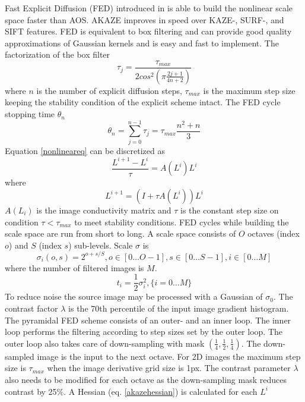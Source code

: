 \documentclass[english,12pt,a4paper,pdftex,elec,utf8, table]{aaltothesis}
\begin{document}
Fast Explicit Diffusion (FED) introduced in \cite{Grewenig2010} is able to build the nonlinear scale space faster than AOS. AKAZE improves in speed over KAZE-, SURF-, and SIFT features. FED is equivalent to box filtering and can provide good quality approximations of Gaussian kernels and is easy and fast to implement. The factorization of the box filter
\begin{equation}
  \label{boxfilterfactor}
\tau_j = \frac{\tau_{max}}{2cos^2\left( \pi \frac{2j+1}{4n+2}\right)}
\end{equation}
where $n$ is the number of explicit diffusion steps, $\tau_{max}$ is the maximum step size keeping the stability condition of the explicit scheme intact. The FED cycle stopping time $\theta_n$
\begin{equation}
\theta_n = \sum_{j=0}^{n-1}\tau_j=\tau_{max}\frac{n^2+n}{3}
\end{equation}
Equation \ref{nonlineareq} can be discretized as
\begin{equation}
  \label{discretenonlineareq}
\frac{L^{i+1}-L^i}{\tau}=A(L^i)L^i
\end{equation}
where
\begin{equation}
  \label{fednextevolution}
  L^{i+1}=(I + \tau A(L^i))L^i
\end{equation}
$A(L_i)$ is the image conductivity matrix and $\tau$ is the constant step size on condition $\tau < \tau_{max}$ to meet stability conditions. FED cycles while building the scale space are run from short to long. A scale space consists of $O$ octaves (index $o$) and $S$ (index $s$) sub-levels. Scale $\sigma$ is
\begin{equation}
  \label{scalespace}
  \sigma_i(o,s) = 2^{o+s/S},o \in[0\ldots O-1], s \in [0\ldots S-1], i \in [0 \ldots M]
  \end{equation}
where the number of filtered images is $M$.
\begin{equation}
  \label{scaletotime}
t_i = \frac{1}{2}\sigma^2_i,\{i=0\ldots M\}
\end{equation}
\clearpage
To reduce noise the source image may be processed with a Gaussian of $\sigma_0$. The contrast factor $\lambda$ is the 70th percentile of the input image gradient histogram. The pyramidal FED scheme consists of an outer-  and an inner loop. The inner loop performs the filtering according to step sizes set by the outer loop. The outer loop also takes care of down-sampling with mask $(\frac{1}{4}, \frac{1}{2}, \frac{1}{4})$. The down-sampled image is the input to the next octave. For 2D images the maximum step size is $\tau_{max}$ when the image derivative grid size is 1px. The contrast parameter $\lambda$ also needs to be modified for each octave as the down-sampling mask reduces contrast by 25\%. A Hessian (eq. \ref{akazehessian}) is calculated for each $L^i$
\end{document}
